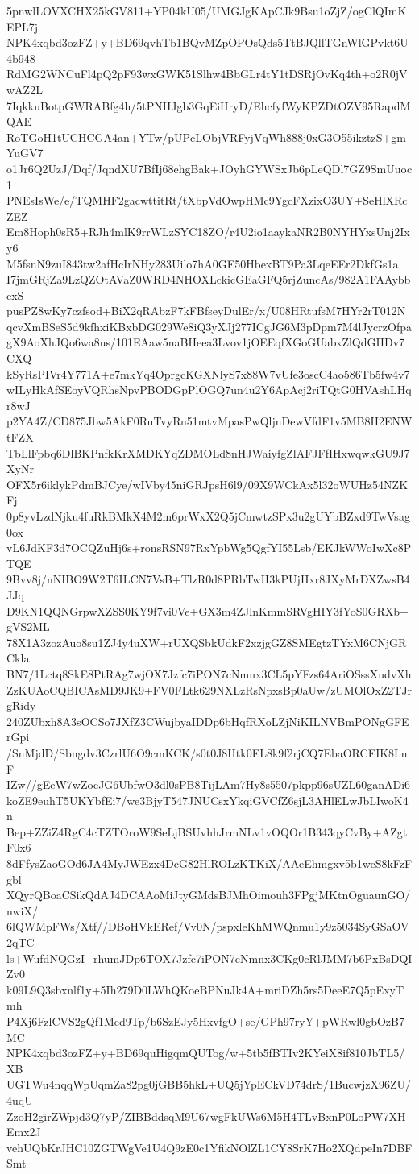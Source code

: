 5pnwlLOVXCHX25kGV811+YP04kU05/UMGJgKApCJk9Bsu1oZjZ/ogClQImKEPL7j
NPK4xqbd3ozFZ+y+BD69qvhTb1BQvMZpOPOsQds5TtBJQllTGnWlGPvkt6U4b948
RdMG2WNCuFl4pQ2pF93wxGWK51Slhw4BbGLr4tY1tDSRjOvKq4th+o2R0jVwAZ2L
7IqkkuBotpGWRABfg4h/5tPNHJgb3GqEiHryD/EhcfyfWyKPZDtOZV95RapdMQAE
RoTGoH1tUCHCGA4an+YTw/pUPcLObjVRFyjVqWh888j0xG3O55ikztzS+gmYuGV7
o1Jr6Q2UzJ/Dqf/JqndXU7BfIj68ehgBak+JOyhGYWSxJb6pLeQDl7GZ9SmUuoc1
PNEsIsWe/e/TQMHF2gacwttitRt/tXbpVdOwpHMc9YgcFXzixO3UY+SeHlXRcZEZ
Em8Hoph0sR5+RJh4mlK9rrWLzSYC18ZO/r4U2io1aaykaNR2B0NYHYxsUnj2Ixy6
M5fsnN9zuI843tw2afHcIrNHy283Uilo7hA0GE50HbexBT9Pa3LqeEEr2DkfGs1a
I7jmGRjZa9LzQZOtAVaZ0WRD4NHOXLckicGEaGFQ5rjZuncAs/982A1FAAybbcxS
pusPZ8wKy7czfsod+BiX2qRAbzF7kFBfseyDulEr/x/U08HRtufsM7HYr2rT012N
qcvXmBSeS5d9kfhxiKBxbDG029We8iQ3yXJj277ICgJG6M3pDpm7M4lJycrzOfpa
gX9AoXhJQo6wa8us/101EAaw5naBHeea3Lvov1jOEEqfXGoGUabxZlQdGHDv7CXQ
kSyRsPIVr4Y771A+e7mkYq4OprgcKGXNlyS7x88W7vUfe3oscC4ao586Tb5fw4v7
wILyHkAfSEoyVQRhsNpvPBODGpPlOGQ7un4u2Y6ApAcj2riTQtG0HVAshLHqr8wJ
p2YA4Z/CD875Jbw5AkF0RuTvyRu51mtvMpasPwQljnDewVfdF1v5MB8H2ENWtFZX
TbLlFpbq6DlBKPnfkKrXMDKYqZDMOLd8nHJWaiyfgZlAFJFfIHxwqwkGU9J7XyNr
OFX5r6iklykPdmBJCye/wIVby45niGRJpsH6l9/09X9WCkAx5l32oWUHz54NZKFj
0p8yvLzdNjku4fuRkBMkX4M2m6prWxX2Q5jCmwtzSPx3u2gUYbBZxd9TwVsag0ox
vL6JdKF3d7OCQZuHj6s+ronsRSN97RxYpbWg5QgfYI55Lsb/EKJkWWoIwXc8PTQE
9Bvv8j/nNIBO9W2T6ILCN7VsB+TlzR0d8PRbTwII3kPUjHxr8JXyMrDXZwsB4JJq
D9KN1QQNGrpwXZSS0KY9f7vi0Ve+GX3m4ZJlnKmmSRVgHIY3fYoS0GRXb+gVS2ML
78X1A3zozAuo8su1ZJ4y4uXW+rUXQSbkUdkF2xzjgGZ8SMEgtzTYxM6CNjGRCkla
BN7/1Lctq8SkE8PtRAg7wjOX7Jzfc7iPON7cNmnx3CL5pYFzs64AriOSssXudvXh
ZzKUAoCQBICAsMD9JK9+FV0FLtk629NXLzRsNpxsBp0aUw/zUMOlOxZ2TJrgRidy
240ZUbxh8A3sOCSo7JXfZ3CWujbyaIDDp6bHqfRXoLZjNiKILNVBmPONgGFErGpi
/SnMjdD/Sbngdv3CzrlU6O9cmKCK/s0t0J8Htk0EL8k9f2rjCQ7EbaORCEIK8LnF
IZw//gEeW7wZoeJG6UbfwO3dl0sPB8TijLAm7Hy8s5507pkpp96sUZL60ganADi6
koZE9euhT5UKYbfEi7/we3BjyT547JNUCsxYkqiGVCfZ6sjL3AHlELwJbLIwoK4n
Bep+ZZiZ4RgC4cTZTOroW9SeLjBSUvhhJrmNLv1vOQOr1B343qyCvBy+AZgtF0x6
8dFfysZaoGOd6JA4MyJWEzx4DcG82HlROLzKTKiX/AAeEhmgxv5b1wcS8kFzFgbl
XQyrQBoaCSikQdAJ4DCAAoMiJtyGMdsBJMhOimouh3FPgjMKtnOguaunGO/nwiX/
6lQWMpFWs/Xtf//DBoHVkERef/Vv0N/pspxleKhMWQnmu1y9z5034SyGSaOV2qTC
ls+WufdNQGzI+rhumJDp6TOX7Jzfc7iPON7cNmnx3CKg0cRlJMM7b6PxBsDQIZv0
k09L9Q3sbxnlf1y+5Ih279D0LWhQKoeBPNuJk4A+mriDZh5rs5DeeE7Q5pExyTmh
P4Xj6FzlCVS2gQf1Med9Tp/b6SzEJy5HxvfgO+se/GPh97ryY+pWRwl0gbOzB7MC
NPK4xqbd3ozFZ+y+BD69quHigqmQUTog/w+5tb5fBTIv2KYeiX8if810JbTL5/XB
UGTWu4nqqWpUqmZa82pg0jGBB5hkL+UQ5jYpECkVD74drS/1BucwjzX96ZU/4uqU
ZzoH2girZWpjd3Q7yP/ZIBBddsqM9U67wgFkUWs6M5H4TLvBxnP0LoPW7XHEmx2J
vehUQbKrJHC10ZGTWgVe1U4Q9zE0c1YfikNOlZL1CY8SrK7Ho2XQdpeIn7DBFSmt
